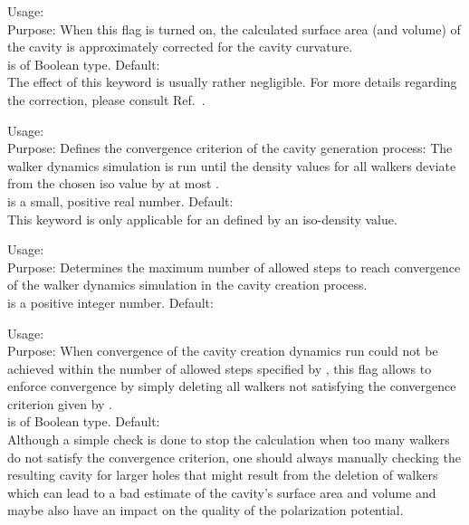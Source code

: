 {
  \noindent
  Usage:   \\[1.0ex] 
  Purpose: When this flag is turned on, the calculated surface 
    area (and volume) of the cavity is approximately corrected 
    for the cavity curvature. \\[1.0ex]
   is of Boolean type. Default:  \\
}
The effect of this keyword is usually rather negligible. 
For more details regarding the correction, please consult 
Ref.~\cite{Sinstein2017_MPE}. 


{
  \noindent
  Usage:  
     \\[1.0ex] 
  Purpose: Defines the convergence criterion of the 
    cavity generation process: The walker dynamics simulation 
    is run until the density values for all walkers deviate 
    from the chosen iso value by at most . \\[1.0ex]
   is a small, positive real number. 
    Default:  \\
}
This keyword is only applicable for an  
defined by an iso-density value. 

{
  \noindent
  Usage:   \\[1.0ex] 
  Purpose: Determines the maximum number of allowed steps 
    to reach convergence of the walker dynamics simulation 
    in the cavity creation process. \\[1.0ex]
   is a positive integer number. Default:  \\
}

{
  \noindent
  Usage:   \\[1.0ex] 
  Purpose: When convergence of the cavity creation dynamics run 
    could not be achieved within the number of allowed steps 
    specified by , this flag allows 
    to enforce convergence by simply deleting all walkers 
    not satisfying the convergence criterion given by 
    . \\[1.0ex]
   is of Boolean type. Default:  \\
}
Although a simple check is done to stop the calculation when 
too many walkers do not satisfy the convergence criterion, one 
should always manually checking the resulting cavity for 
larger holes that might result from the deletion of walkers 
which can lead to a bad estimate of the cavity's surface area 
and volume and maybe also have an impact on the quality of 
the polarization potential. 

